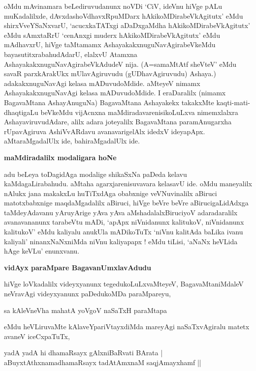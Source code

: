 \noindent
oMdu mAvinamara beLediruvudanunx noVDi `CiV, ideVnu hiVge pALu muKa\-dalilxde, dAvxdashoV\-dhavxR\-puMDarx hAkikoMDirabeVkAgitutx' eMdu shirxVveYSaNxvarU, `acucx\-kaTATxgi aDaDxgaMdha hAkikoMDira\-beVkA\-gitutx' eMdu sAmxtaRrU `cenAnxgi muderx hAki\-koMDirabeVkAgitutx' eMdu mAdhavxrU, hiVge taMtamamx Ashaya\-kakxnu\-guNa\-vAgira\-beVkeMdu bayasutitxrabahudAdarU, elalxvU Atamxna AshayakakxnuguNavAgirabeVkA\-dudeV nija. (A=samaMtAtf sheVteV' eMdu savaR parxkArakUkx mUlavAgiruvudu (gUDhavAgiruvudu) A\-shaya.) adakakxnuguNavAgi kelasa mADuvu\-doMdide. aMteyeV nimamx AshayakakxnuguNavAgi kelasa mADuvu\-doMdide. I eraDaralilx (nimamx BagavaMtana AshayAnuguNa) BagavaMtana Ashayakekx takakxMte kaqti-\-mati-\-dhaqtigaLu beVkeMdu vijAcnxna maMdiradavarenisikoLuLxva nimemxlalxra AshayaviruvudAdare, alilx adara jote\-yalilx BagavaMtana paramAnugarxha rUpavAgiruva AshiVvARdavu avanavarigelAlx idedxV ide\-yapApx. aMta\-raMgadalUlx ide, bahiraMgadalUlx ide. 

{\bigskip
\noindent
{\large\bf maMdiradalilx modaligara hoNe}}\label{page70}
\medskip

\noindent
adu beLeya toDagidAga modalige shikaSxNa paDeda kelavu kaMdagaLirabahudu. aMtaha agarxjarenisuva\-vara kelasavU ide. oMdu maneyalilx nAlukx jana makakxLu huTiTxdAga obabxnige veVNuvinalilx aBi\-ruci matotxbabx\-nige maqdaMgadalilx aBiruci, hiVge beVre beVre aBirucigaLidAdxga taMdeyAdavanu yAru\-yA\-rige yAva yAva aMshadalalxBiruciyoV adaradaralilx avanavananunx tarabeVtu mADi, `apApx niVnidanunx kalitukoV, niVnidanunx kalitukoV' eMdu kaliyalu anukUla mADikoTuTx `niVnu kalitAda baLika ivanu kaliyali' ninanxNaNxniMda niVnu kaliyapapx ! eMdu tiLisi, `aNaNx heVLida hAge keVLu' enunxvanu.

{\bigskip
\noindent
{\large\bf vidAyx paraMpare BagavanUmxlavAdudu}}
\medskip

\noindent
hiVge loVkadalilx videyxyanunx tegedukoLuLxvaMteyeV, BagavaMtaniMdaleV neVravAgi videyxyanunx paDe\-du\-koMDa paraMpareyu,

\begin{shloka}
sa kAleVneVha mahatA yoVgoV naSaTxH paraMtapa\label{62}\label{70}
\end{shloka}

eMdu heVLiruvaMte kAlaveYpariVtayxdiMda mareyAgi naSaTxvAgiralu matetx avaneV iceCxpaTuTx,

\begin{shloka}
yadA yadA hi dhamaRsayx gAlxniBaRvati BArata |\\\label{71}
aBuyxtAthxnamadhamaRsayx tadAtAmxnaM saqjAmayxhamf ||
\end{shloka}

